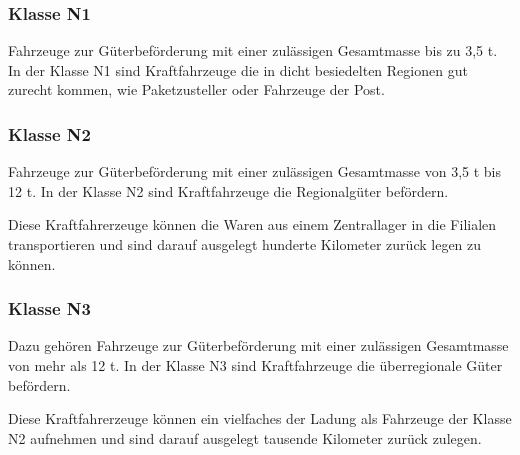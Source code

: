 \subsubsection{Klasse N1}
Fahrzeuge zur Güterbeförderung mit einer zulässigen Gesamtmasse bis zu 3,5 \ac{t}.
In der Klasse N1 sind Kraftfahrzeuge die in dicht besiedelten Regionen gut zurecht kommen, wie Paketzusteller oder Fahrzeuge der Post.


\subsubsection{Klasse N2}
Fahrzeuge zur Güterbeförderung mit einer zulässigen Gesamtmasse von 3,5 \ac{t} bis 12 \ac{t}.
In der Klasse N2 sind Kraftfahrzeuge die Regionalgüter befördern.

Diese Kraftfahrerzeuge können die Waren aus einem Zentrallager in die Filialen transportieren
und sind darauf ausgelegt hunderte Kilometer zurück legen zu können.

\subsubsection{Klasse N3}
Dazu gehören Fahrzeuge zur Güterbeförderung mit einer zulässigen Gesamtmasse von mehr als 12 \ac{t}.
In der Klasse N3 sind Kraftfahrzeuge die überregionale Güter befördern.

Diese Kraftfahrerzeuge können ein vielfaches der Ladung als Fahrzeuge der Klasse N2 aufnehmen
und sind darauf ausgelegt tausende Kilometer zurück zulegen.

